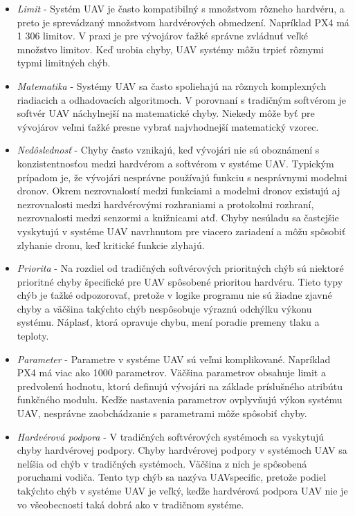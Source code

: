 \documentclass[10pt,twoside,slovak,a4paper]{article}
\begin{document}
\begin{itemize}
\item \emph{Limit} - Systém UAV je často kompatibilný s množstvom rôzneho hardvéru, a preto je sprevádzaný množstvom hardvérových obmedzení. Napríklad PX4 má 1 306 limitov. V praxi je pre vývojárov ťažké správne zvládnuť veľké množstvo limitov. Keď urobia chyby, UAV systémy môžu trpieť rôznymi typmi limitných chýb.
\item \emph{Matematika} - Systémy UAV sa často spoliehajú na rôznych komplexných riadiacich a odhadovacích algoritmoch. V porovnaní s tradičným softvérom je softvér UAV náchylnejší na matematické chyby. Niekedy môže byť pre vývojárov veľmi ťažké presne vybrať najvhodnejší matematický vzorec.
\item \emph{Nedôslednosť} - Chyby často vznikajú, keď vývojári nie sú oboznámení s konzistentnosťou medzi hardvérom a softvérom v systéme UAV. Typickým prípadom je, že vývojári nesprávne používajú funkciu s nesprávnymi modelmi dronov. Okrem nezrovnalostí medzi funkciami a modelmi dronov existujú aj nezrovnalosti medzi hardvérovými rozhraniami a protokolmi rozhraní, nezrovnalosti medzi senzormi a knižnicami atď. Chyby nesúladu sa častejšie vyskytujú v systéme UAV navrhnutom pre viacero zariadení a môžu spôsobiť zlyhanie dronu, keď kritické funkcie zlyhajú.
\item \emph{Priorita} - Na rozdiel od tradičných softvérových prioritných chýb sú niektoré prioritné chyby špecifické pre UAV spôsobené prioritou hardvéru. Tieto typy chýb je ťažké odpozorovať, pretože v logike programu nie sú žiadne zjavné chyby a väčšina takýchto chýb nespôsobuje výraznú odchýlku výkonu systému. Náplasť, ktorá opravuje chybu, mení poradie premeny tlaku a teploty.
\item \emph{Parameter} - Parametre v systéme UAV sú veľmi komplikované. Napríklad PX4
má viac ako 1000 parametrov. Väčšina parametrov obsahuje limit
a predvolenú hodnotu, ktorú definujú vývojári na základe príslušného atribútu funkčného modulu. Keďže nastavenia parametrov ovplyvňujú výkon systému UAV, nesprávne zaobchádzanie s parametrami
môže spôsobiť chyby.
\item \emph{Hardvérová podpora} - V tradičných softvérových systémoch sa vyskytujú chyby hardvérovej podpory. Chyby hardvérovej podpory v systémoch UAV sa nelíšia od chýb v tradičných systémoch. Väčšina z nich je spôsobená poruchami vodiča. Tento typ chýb sa nazýva UAVspecific, pretože podiel takýchto chýb v systéme UAV je veľký, keďže hardvérová podpora UAV nie je vo všeobecnosti taká dobrá ako v tradičnom systéme.

\end{itemize}
\end{document}

